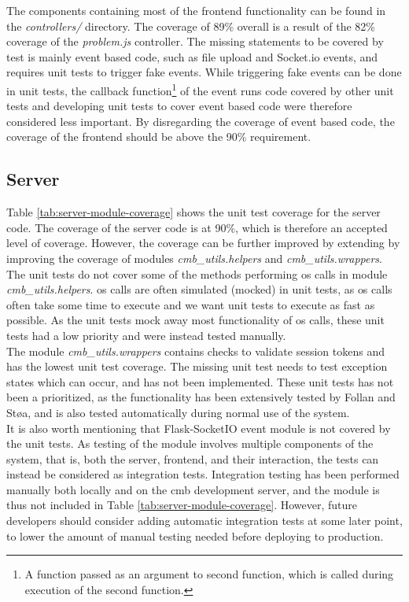 The components containing most of the frontend functionality can be found in the \textit{controllers/} directory. The coverage of 89\% overall is a result of the 82\% coverage of the \textit{problem.js} controller. The missing statements to be covered by test is mainly event based code, such as file upload and Socket.io events, and requires unit tests to trigger fake events. While triggering fake events can be done in unit tests, the callback function\footnote{A function passed as an argument to second function, which is called during execution of the second function.} of the event runs code covered by other unit tests and developing unit tests to cover event based code were therefore considered less important. By disregarding the coverage of event based code, the coverage of the frontend should be above the 90\% requirement.


\subsection{Server}
Table \ref{tab:server-module-coverage} shows the unit test coverage for the server code. The coverage of the server code is at 90\%, which is therefore an accepted level of coverage. However, the coverage can be further improved by extending by improving the coverage of modules \textit{cmb\_utils.helpers} and \textit{cmb\_utils.wrappers}. \\

The unit tests do not cover some of the methods performing \gls{os} calls in module \textit{cmb\_utils.helpers}. \gls{os} calls are often simulated (mocked) in unit tests, as \gls{os} calls often take some time to execute and we want unit tests to execute as fast as possible. As the unit tests mock away most functionality of \gls{os} calls, these unit tests had a low priority and were instead tested manually. \\

The module \textit{cmb\_utils.wrappers} contains checks to validate session tokens and has the lowest unit test coverage. The missing unit test needs to test exception states which can occur, and has not been implemented. These unit tests has not been a prioritized, as the functionality has been extensively tested by Follan and Støa, and is also tested automatically during normal use of the system. \\

It is also worth mentioning that Flask-SocketIO event module is not covered by the unit tests. As testing of the module involves multiple components of the system, that is, both the server, frontend, and their interaction, the tests can instead be considered as integration tests. Integration testing has been performed manually both locally and on the \gls{cmb} development server, and the module is thus not included in Table \ref{tab:server-module-coverage}. However, future developers should consider adding automatic integration tests at some later point, to lower the amount of manual testing needed before deploying to production.

